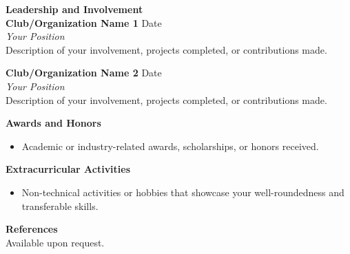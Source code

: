 \documentclass[11pt,a4paper]{article}
\newcommand{\ressection}[1]{\vspace{8pt}\large\textbf{#1}\vspace{4pt}\\}
\newcommand{\ressubsection}[3]{\textbf{#1} \hfill #2\\ \textit{#3}\\}
\begin{document}
\ressection{Leadership and Involvement}
\ressubsection{Club/Organization Name 1}{Date}{Your Position}
Description of your involvement, projects completed, or contributions made.

\ressubsection{Club/Organization Name 2}{Date}{Your Position}
Description of your involvement, projects completed, or contributions made.

\ressection{Awards and Honors}
\begin{itemize}[leftmargin=*]
    \item Academic or industry-related awards, scholarships, or honors received.
\end{itemize}

\ressection{Extracurricular Activities}
\begin{itemize}[leftmargin=*]
    \item Non-technical activities or hobbies that showcase your well-roundedness and transferable skills.
\end{itemize}

\ressection{References}
Available upon request.
\end{document}
